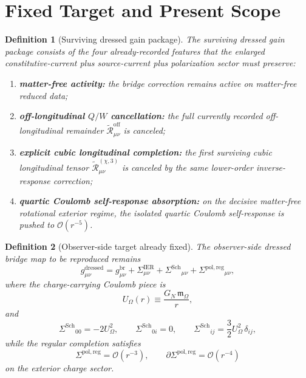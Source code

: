 \documentclass[11pt]{article}
\newcommand{\CoulPot}{U_\Omega}
\newcommand{\HamChargeOmega}{\mathfrak m_\Omega}
\newcommand{\SigmaIER}{\Sigma^{\mathrm{IER}}}
\newcommand{\SigmaDressSch}{\Sigma^{\mathrm{Sch}}}
\newcommand{\SigmaRegPol}{\Sigma^{\mathrm{pol,reg}}}
\newcommand{\ReOff}{\widetilde{\mathcal R}_{\mu\nu}^{\mathrm{off}}}
\newcommand{\ReLongThree}{\widetilde{\mathcal R}_{\mu\nu}^{(\chi,3)}}
\newtheorem{definition}{Definition}
\begin{document}
\section{Fixed Target and Present Scope}

\begin{definition}[Surviving dressed gain package]
\label{def:gains}
The \emph{surviving dressed gain package} consists of the four already-recorded features that the enlarged constitutive-current plus source-current plus polarization sector must preserve:
\begin{enumerate}
    \item \textbf{matter-free activity:} the bridge correction remains active on matter-free reduced data;
    \item \textbf{off-longitudinal \(Q/W\) cancellation:} the full currently recorded off-longitudinal remainder \(\ReOff\) is canceled;
    \item \textbf{explicit cubic longitudinal completion:} the first surviving cubic longitudinal tensor \(\ReLongThree\) is canceled by the same lower-order inverse-response correction;
    \item \textbf{quartic Coulomb self-response absorption:} on the decisive matter-free rotational exterior regime, the isolated quartic Coulomb self-response is pushed to \(\mathcal O(r^{-5})\).
\end{enumerate}
\end{definition}

\begin{definition}[Observer-side target already fixed]
\label{def:target}
The observer-side dressed bridge map to be reproduced remains
\begin{equation}
g_{\mu\nu}^{\mathrm{dressed}}
=
g_{\mu\nu}^{\mathrm{br}}
+\SigmaIER_{\mu\nu}
+\SigmaDressSch{}_{\mu\nu}
+\SigmaRegPol{}_{\mu\nu},
\label{eq:targetmetric}
\end{equation}
where the charge-carrying Coulomb piece is
\begin{equation}
\CoulPot(r)\equiv \frac{G_N\,\HamChargeOmega}{r},
\label{eq:coulpot}
\end{equation}
and
\begin{equation}
\SigmaDressSch{}_{00}=-2\CoulPot^2,
\qquad
\SigmaDressSch{}_{0i}=0,
\qquad
\SigmaDressSch{}_{ij}=\frac32\CoulPot^2\,\delta_{ij},
\label{eq:schdress}
\end{equation}
while the regular completion satisfies
\begin{equation}
\SigmaRegPol=\mathcal O(r^{-3}),
\qquad
\partial\SigmaRegPol=\mathcal O(r^{-4})
\label{eq:reg}
\end{equation}
on the exterior charge sector.
\end{definition}
\end{document}
